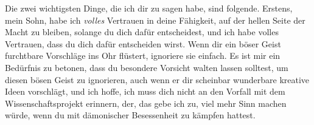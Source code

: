 \begin{writtenNote}
Die zwei wichtigsten Dinge, die ich dir zu sagen habe, sind folgende. Erstens, mein Sohn, habe ich \emph{volles} Vertrauen in deine Fähigkeit, auf der hellen Seite der Macht zu bleiben, solange du dich dafür entscheidest, und ich habe volles Vertrauen, dass du dich dafür entscheiden wirst. Wenn dir ein böser Geist furchtbare Vorschläge ins Ohr flüstert, ignoriere sie einfach. Es ist mir ein Bedürfnis zu betonen, dass du besondere Vorsicht walten lassen solltest, um diesen bösen Geist zu ignorieren, auch wenn er dir scheinbar wunderbare kreative Ideen vorschlägt, und ich hoffe, ich muss dich nicht an den Vorfall mit dem Wissenschaftsprojekt erinnern, der, das gebe ich zu, viel mehr Sinn machen würde, wenn du mit dämonischer Besessenheit zu kämpfen hattest.


\end{writtenNote}
